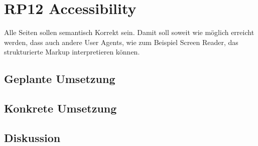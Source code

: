 \section{RP12 Accessibility}
\label{sec:principle-rp12-accessibility}

Alle Seiten sollen semantisch Korrekt sein. Damit soll soweit wie möglich erreicht werden, dass auch andere User Agents, wie zum Beispiel Screen Reader, das strukturierte Markup interpretieren können.

\subsection*{Geplante Umsetzung}


\subsection*{Konkrete Umsetzung}


\subsection*{Diskussion}
